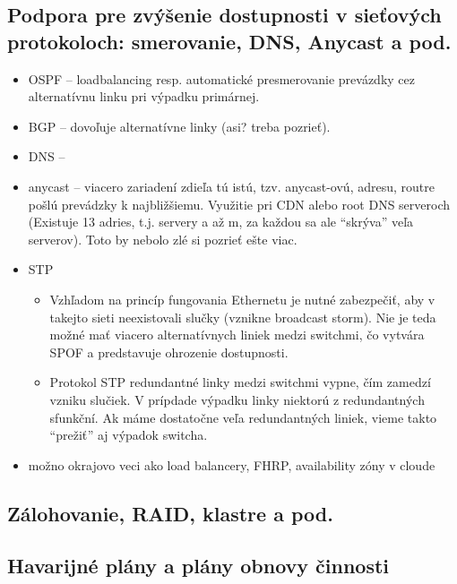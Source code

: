 \documentclass[12pt,a4paper]{article}
\begin{document}
{    \subsection{Podpora pre zvýšenie dostupnosti v sieťových protokoloch: smerovanie, DNS, Anycast a pod.}
    \begin{itemize}
        \item OSPF -- loadbalancing resp. automatické presmerovanie prevázdky cez alternatívnu linku pri výpadku primárnej.
        \item BGP -- dovoľuje alternatívne linky (asi? treba pozrieť).
        \item DNS -- 
        \item anycast -- viacero zariadení zdieľa tú istú, tzv. anycast-ovú, adresu, routre pošlú prevádzky k najbližšiemu. Využitie pri CDN alebo root DNS serveroch (Existuje 13 adries, t.j. servery a až m, za každou sa ale ``skrýva'' veľa serverov). Toto by nebolo zlé si pozrieť ešte viac.
        \item STP
        \begin{itemize}
            \item Vzhľadom na princíp fungovania Ethernetu je nutné zabezpečiť, aby v takejto sieti neexistovali slučky (vznikne broadcast storm). Nie je teda možné mať viacero alternatívnych liniek medzi switchmi, čo vytvára SPOF a predstavuje ohrozenie dostupnosti. 
            \item Protokol STP redundantné linky medzi switchmi vypne, čím zamedzí vzniku slučiek. V prípdade výpadku linky niektorú z redundantných sfunkční. Ak máme dostatočne veľa redundantných liniek, vieme takto ``prežiť'' aj výpadok switcha.
        \end{itemize}
        \item možno okrajovo veci ako load balancery, FHRP, availability zóny v cloude
    \end{itemize}
    \subsection{Zálohovanie, RAID, klastre a pod.}
    \subsection{Havarijné plány a plány obnovy činnosti}
}
\end{document}
